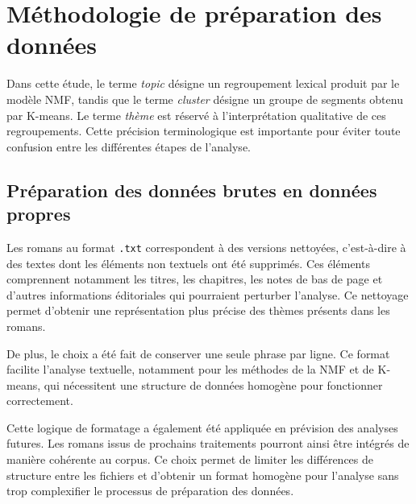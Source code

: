 \section{Méthodologie de préparation des données}

Dans cette étude, le terme \textit{topic} désigne un regroupement lexical produit par le modèle NMF, tandis que le terme \textit{cluster} désigne un groupe de segments obtenu par K-means. Le terme \textit{thème} est réservé à l'interprétation qualitative de ces regroupements. Cette précision terminologique est importante pour éviter toute confusion entre les différentes étapes de l'analyse.

\subsection{Préparation des données brutes en données propres}

Les romans au format \texttt{.txt} correspondent à des versions nettoyées, c'est-à-dire à des textes dont les éléments non textuels ont été supprimés. Ces éléments comprennent notamment les titres, les chapitres, les notes de bas de page et d'autres informations éditoriales qui pourraient perturber l'analyse. Ce nettoyage permet d'obtenir une représentation plus précise des thèmes présents dans les romans.

De plus, le choix a été fait de conserver une seule phrase par ligne. Ce format facilite l'analyse textuelle, notamment pour les méthodes de la NMF et de K-means, qui nécessitent une structure de données homogène pour fonctionner correctement.

Cette logique de formatage a également été appliquée en prévision des analyses futures. Les romans issus de prochains traitements pourront ainsi être intégrés de manière cohérente au corpus. Ce choix permet de limiter les différences de structure entre les fichiers et d'obtenir un format homogène pour l'analyse sans trop complexifier le processus de préparation des données.

